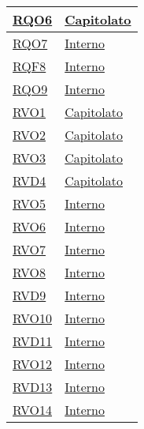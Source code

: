 \begin{longtable}{|>{\centering}m{5cm}|m{5cm}<{\centering}|}
\hyperlink{RQO6}{RQO6} & \hyperlink{Capitolato}{Capitolato}\\ \hline

\hyperlink{RQO7}{RQO7} & \hyperlink{Interno}{Interno}\\ \hline

\hyperlink{RQF8}{RQF8} & \hyperlink{Interno}{Interno}\\ \hline

\hyperlink{RQO9}{RQO9} & \hyperlink{Interno}{Interno}\\ \hline

\hyperlink{RVO1}{RVO1} & \hyperlink{Capitolato}{Capitolato}\\ \hline

\hyperlink{RVO2}{RVO2} & \hyperlink{Capitolato}{Capitolato}\\ \hline

\hyperlink{RVO3}{RVO3} & \hyperlink{Capitolato}{Capitolato}\\ \hline

\hyperlink{RVD4}{RVD4} & \hyperlink{Capitolato}{Capitolato}\\ \hline

\hyperlink{RVO5}{RVO5} & \hyperlink{Interno}{Interno}\\ \hline

\hyperlink{RVO6}{RVO6} & \hyperlink{Interno}{Interno}\\ \hline

\hyperlink{RVO7}{RVO7} & \hyperlink{Interno}{Interno}\\ \hline

\hyperlink{RVO8}{RVO8} & \hyperlink{Interno}{Interno}\\ \hline

\hyperlink{RVD9}{RVD9} & \hyperlink{Interno}{Interno}\\ \hline

\hyperlink{RVO10}{RVO10} & \hyperlink{Interno}{Interno}\\ \hline

\hyperlink{RVD11}{RVD11} & \hyperlink{Interno}{Interno}\\ \hline

\hyperlink{RVO12}{RVO12} & \hyperlink{Interno}{Interno}\\ \hline

\hyperlink{RVD13}{RVD13} & \hyperlink{Interno}{Interno}\\ \hline

\hyperlink{RVO14}{RVO14} & \hyperlink{Interno}{Interno}\\ \hline


\end{longtable}
